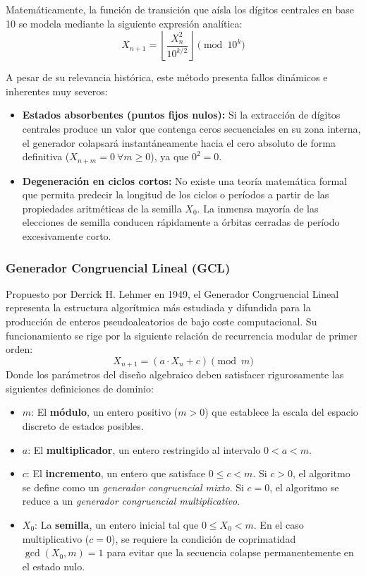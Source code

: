 \documentclass{article}
\begin{document}
Matemáticamente, la función de transición que aísla los dígitos centrales en base 10 se modela mediante la siguiente expresión analítica:
\begin{equation}
    X_{n+1} = \left\lfloor \frac{X_n^2}{10^{k/2}} \right\rfloor \pmod{10^k}
\end{equation}

A pesar de su relevancia histórica, este método presenta fallos dinámicos e inherentes muy severos:
\begin{itemize}
    \item \textbf{Estados absorbentes (puntos fijos nulos):} Si la extracción de dígitos centrales produce un valor que contenga ceros secuenciales en su zona interna, el generador colapsará instantáneamente hacia el cero absoluto de forma definitiva ($X_{n+m} = 0 \ \forall m \ge 0$), ya que $0^2 = 0$.
    \item \textbf{Degeneración en ciclos cortos:} No existe una teoría matemática formal que permita predecir la longitud de los ciclos o períodos a partir de las propiedades aritméticas de la semilla $X_0$. La inmensa mayoría de las elecciones de semilla conducen rápidamente a órbitas cerradas de período excesivamente corto.
\end{itemize}

\subsubsection{Generador Congruencial Lineal (GCL)}
Propuesto por Derrick H. Lehmer en 1949, el Generador Congruencial Lineal representa la estructura algorítmica más estudiada y difundida para la producción de enteros pseudoaleatorios de bajo coste computacional. Su funcionamiento se rige por la siguiente relación de recurrencia modular de primer orden:
\begin{equation}
    X_{n+1} = (a \cdot X_n + c) \pmod{m}
\end{equation}
Donde los parámetros del diseño algebraico deben satisfacer rigurosamente las siguientes definiciones de dominio:
\begin{itemize}
    \item $m$: El \textbf{módulo}, un entero positivo ($m > 0$) que establece la escala del espacio discreto de estados posibles.
    \item $a$: El \textbf{multiplicador}, un entero restringido al intervalo $0 < a < m$.
    \item $c$: El \textbf{incremento}, un entero que satisface $0 \le c < m$. Si $c > 0$, el algoritmo se define como un \emph{generador congruencial mixto}. Si $c = 0$, el algoritmo se reduce a un \emph{generador congruencial multiplicativo}.
    \item $X_0$: La \textbf{semilla}, un entero inicial tal que $0 \le X_0 < m$. En el caso multiplicativo ($c = 0$), se requiere la condición de coprimatidad $\gcd(X_0, m) = 1$ para evitar que la secuencia colapse permanentemente en el estado nulo.
\end{itemize}
\end{document}
